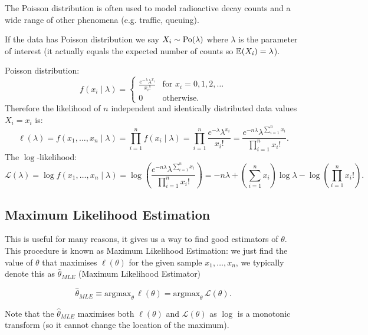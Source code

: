 \documentclass[10pt, a4paper]{article}
\begin{document}
\begin{example}
    The Poisson distribution is often used to model radioactive decay counts and a wide range of other phenomena
    (e.g. traffic,
    queuing).

    If the data has Poisson distribution we say $X_i \sim \operatorname{Po}(\lambda)$ where $\lambda$ is the parameter of interest
    (it actually equals the expected number of counts so $\mathbb{E}(X_i) = \lambda$).

    \begin{solution}
        Poisson distribution:
        \[
        f(x_i \mid \lambda) = \begin{cases}
            \frac{e ^ {-\lambda}\lambda ^ {x_i}}{x_i!} &\text{for } x_i = 0, 1, 2, \dotsc \\
            0 &\text{otherwise}.
        \end{cases}
        \]
        Therefore the likelihood of $n$ independent and identically distributed data values $X_i = x_i$ is:
        \[
        \ell(\lambda) = f(x_1, \dotsc, x_n\mid \lambda) = \prod_{i = 1}^{n}f(x_i\mid \lambda) = \prod_{i = 1}^{n}\frac{e ^ {-\lambda}\lambda ^ {x_i}}{x_i!} = \frac{e ^ {-n\lambda}\lambda ^ {\sum_{i = 1}^{n}x_i}}{\prod_{i = 1}^{n}x_i!}.
        \]
        The $\log$-likelihood:
        \[
        \mathcal{L}(\lambda) = \log{f(x_1, \dotsc, x_n\mid \lambda)} = \log\left(\frac{e ^ {-n\lambda}\lambda ^ {\sum_{i = 1}^{n}x_i}}{\prod_{i = 1}^{n}x_i!}\right) = -n\lambda + \left(\sum_{i = 1}^{n}x_i\right)\log{\lambda} - \log\left(\prod_{i = 1}^{n}x_i!\right).
        \]
    \end{solution}
\end{example}

\subsection{Maximum Likelihood Estimation}
This is useful for many reasons,
it gives us a way to find good estimators of $\theta$.
This procedure is known as Maximum Likelihood Estimation:
we just find the value of $\theta$ that maximises $\ell(\theta)$ for the given sample $x_1, \dotsc, x_n$,
we typically denote this as $\hat{\theta}_{MLE}$
(Maximum Likelihood Estimator)

\begin{definition}
    \[
    \hat{\theta}_{MLE} \equiv \mathrm{argmax}_{\theta}\,\ell(\theta) = \mathrm{argmax}_{\theta}\,\mathcal{L}(\theta).
    \]
\end{definition}
Note that the $\hat{\theta}_{MLE}$ maximises both $\ell(\theta)$ and $\mathcal{L}(\theta)$ as $\log$ is a monotonic transform
(so it cannot change the location of the maximum).
\end{document}
